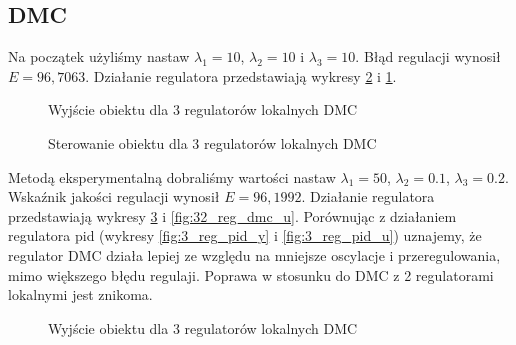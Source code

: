 \subsection{DMC}
Na początek użyliśmy nastaw $\lambda_1=10$, $\lambda_2=10$ i $\lambda_3=10$. Błąd regulacji wynosił $E=96,7063$. Działanie regulatora przedstawiają wykresy \ref{fig:31_reg_dmc_u} i \ref{fig:31_reg_dmc_y}.

\begin{figure}[H]
\centering
{}
\caption{Wyjście obiektu dla 3 regulatorów lokalnych DMC}
\label{fig:31_reg_dmc_y}
\end{figure}

\begin{figure}[H]
\centering
{}
\caption{Sterowanie obiektu dla 3 regulatorów lokalnych DMC}
\label{fig:31_reg_dmc_u}
\end{figure}

Metodą eksperymentalną dobraliśmy wartości nastaw $\lambda_1=50$, $\lambda_2=0.1$, $\lambda_3=0.2$. Wskaźnik jakości regulacji wynosił $E=96,1992$. Działanie regulatora przedstawiają wykresy \ref{fig:32_reg_dmc_y} i \ref{fig:32_reg_dmc_u}. Porównując z działaniem regulatora pid (wykresy \ref{fig:3_reg_pid_y} i \ref{fig:3_reg_pid_u}) uznajemy, że regulator DMC działa lepiej ze względu na mniejsze oscylacje i przeregulowania, mimo większego błędu regulaji. Poprawa w stosunku do DMC z 2 regulatorami lokalnymi jest znikoma.

\begin{figure}[H]
\centering
{}
\caption{Wyjście obiektu dla 3 regulatorów lokalnych DMC}
\label{fig:32_reg_dmc_y}
\end{figure}


